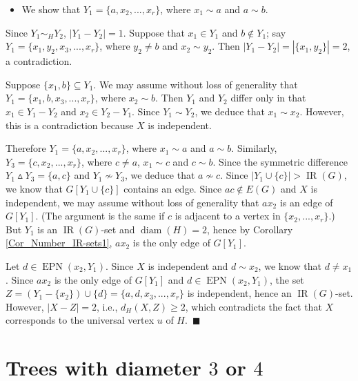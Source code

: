 \documentclass[12pt]{article}%
\begin{document}
\begin{itemize}
\item We show that $Y_{1}=\{a,x_{2},...,x_{r}\}$, where $x_{1}\sim a$ and
$a\sim b$.
\end{itemize}

Since $Y_{1}\sim_{H}Y_{2}$, $|Y_{1}-Y_{2}|=1$. Suppose that $x_{1}\in Y_{1}$
and $b\notin Y_{1}$; say $Y_{1}=\{x_{1},y_{2},x_{3},...,x_{r}\}$, where
$y_{2}\neq b$ and $x_{2}\sim y_{2}$. Then $|Y_{1}-Y_{2}|=|\{x_{1},y_{2}\}|=2$,
a contradiction.

Suppose $\{x_{1},b\}\subseteq Y_{1}$. We may assume without loss of generality
that $Y_{1}=\{x_{1},b,x_{3},...,x_{r}\}$, where $x_{2}\sim b$. Then $Y_{1}$
and $Y_{2}$ differ only in that $x_{1}\in Y_{1}-Y_{2}$ and $x_{2}\in
Y_{2}-Y_{1}$. Since $Y_{1}\sim Y_{2}$, we deduce that $x_{1}\sim x_{2}$.
However, this is a contradiction because $X$ is independent.

Therefore $Y_{1}=\{a,x_{2},...,x_{r}\}$, where $x_{1}\sim a$ and $a\sim b$.
Similarly, $Y_{3}=\{c,x_{2},...,x_{r}\}$, where $c\neq a$, $x_{1}\sim c$ and
$c\sim b$. Since the symmetric difference $Y_{1}\vartriangle Y_{3}=\{a,c\}$
and $Y_{1}\nsim Y_{3}$, we deduce that $a\nsim c$. Since $|Y_{1}%
\cup\{c\}|>\operatorname{IR}(G)$, we know that $G[Y_{1}\cup\{c\}]$ contains an
edge. Since $ac\notin E(G)$ and $X$ is independent, we may assume without loss
of generality that $ax_{2}$ is an edge of $G[Y_{1}]$. (The argument is the
same if $c$ is adjacent to a vertex in $\{x_{2},...,x_{r}\}$.) But $Y_{1}$ is
an $\operatorname{IR}(G)$-set and $\operatorname{diam}(H)=2$, hence by
Corollary \ref{Cor_Number_IR-sets1}, $ax_{2}$ is the only edge of $G[Y_{1}]$.

Let $d\in\operatorname{EPN}(x_{2},Y_{1})$. Since $X$ is independent and $d\sim
x_{2}$, we know that $d\neq x_{1}$. Since $ax_{2}$ is the only edge of
$G[Y_{1}]$ and $d\in\operatorname{EPN}(x_{2},Y_{1})$, the set $Z=(Y_{1}%
-\{x_{2}\})\cup\{d\}=\{a,d,x_{3},...,x_{r}\}$ is independent, hence an
$\operatorname{IR}(G)$-set. However, $|X-Z|=2$, i.e., $d_{H}(X,Z)\geq2$, which
contradicts the fact that $X$ corresponds to the universal vertex $u$ of
$H$.~$\blacksquare$

\section{Trees with diameter $3$ or $4$}
\end{document}
